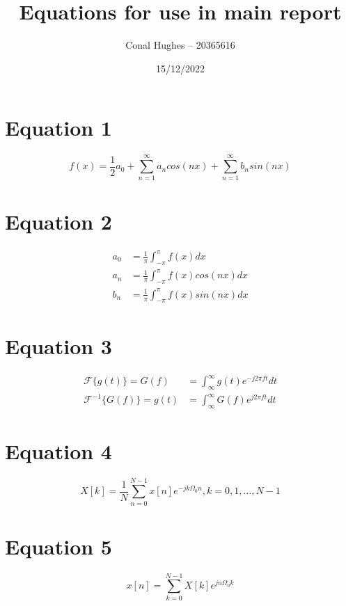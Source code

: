 \documentclass[12pt]{article}
\title{\textbf{Equations for use in main report}}
\author{Conal Hughes -- 20365616}
\date{15/12/2022}
\begin{document}
\maketitle


\section{Equation 1} %
\begin{equation}
    f(x) = \frac{1}{2} a_0 + \sum^{\infty}_{n=1} a_n cos(nx) + \sum^{\infty}_{n=1} b_n sin(nx)
\end{equation}




\section{Equation 2} %
\begin{align}
    a_0 &= \frac{1}{\pi} \int^{\pi}_{-\pi} f(x) dx\\
    a_n &= \frac{1}{\pi} \int^{\pi}_{-\pi} f(x)cos(nx) dx\\
    b_n &= \frac{1}{\pi} \int^{\pi}_{-\pi} f(x)sin(nx) dx
\end{align}






\section{Equation 3} %
\begin{align}
    \mathcal{F}\{g(t)\} = G(f) &= \int^{\infty}_{\infty}g(t) e^{-j2\pi ft}dt\\
    \mathcal{F}^{-1}\{G(f)\} = g(t) &= \int^{\infty}_{\infty}G(f) e^{j2\pi ft}dt
\end{align}





\section{Equation 4} %
\begin{equation}
    X[k] = \frac{1}{N} \sum^{N-1}_{n=0} x[n]e^{-jk\Omega_0n},k = 0,1,\ldots, N-1
\end{equation}







\section{Equation 5} %
\begin{equation}
    x[n] = \sum^{N-1}_{k=0} X[k]e^{jn\Omega_0k}
\end{equation}
\end{document}
